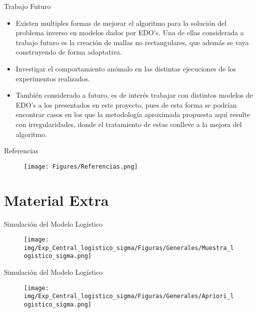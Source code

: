 \documentclass[10pt,aspectratio=169]{beamer}
\begin{document}
\begin{frame}{Trabajo Futuro}
  \begin{itemize}
    \item 
    Existen multiples formas de mejorar el algoritmo para la solución del problema inverso en modelos dados por EDO's. Una de ellas considerada a trabajo futuro es la creación de mallas no rectangulares, que además se vaya construyendo de forma adaptativa.

    \vspace{0.5 cm}

    \item Investigar el comportamiento anómalo en las distintas ejecuciones de los experimentos realizados.

    \vspace{0.5 cm}

    \item También considerado a futuro, es de interés trabajar con distintos modelos de EDO's a los presentados en este proyecto, pues de esta forma se podrían encontrar casos en los que la metodología aproximada propuesta aquí resulte con irregularidades, donde el tratamiento de estas conlleve a la mejora del algoritmo.
  \end{itemize}
\end{frame}


\begin{frame}{Referencias}

  \begin{figure}[H] 
    \centering 
    \texttt{[image: Figures/Referencias.png]} 
  \end{figure} 

\end{frame}

\section{Material Extra}


\begin{frame}{Simulación del Modelo Logístico}
  \begin{figure}
    \centering 
    \texttt{[image: img/Exp\_Central\_logistico\_sigma/Figuras/Generales/Muestra\_logistico\_sigma.png]} 
    \label{Fig. 3.2.log.muestra}
  \end{figure} 
\end{frame}


\begin{frame}{Simulación del Modelo Logístico}
  \begin{figure} 
    \centering 
    \texttt{[image: img/Exp\_Central\_logistico\_sigma/Figuras/Generales/Apriori\_logistico\_sigma.png]}     
    \label{Fig. 3.2.log.priori}
  \end{figure} 
\end{frame}
\end{document}

